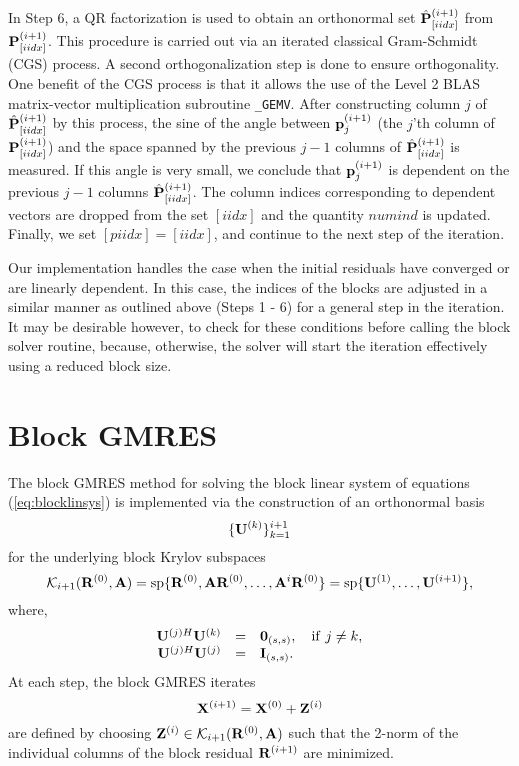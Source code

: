 \documentclass[twoside]{siamltex}
\newcommand{\bA}{{\bf A}}
\newcommand{\bI}{{\bf I}}
\newcommand{\bP}{{\bf P}}
\newcommand{\bZ}{{\bf Z}}
\newcommand{\bU}{{\bf U}}
\newcommand{\bR}{{\bf R}}
\newcommand{\bX}{{\bf X}}
\newcommand{\bp}{{\bf p}}
\newcommand{\dm}{\begin{displaymath}}
\newcommand{\edm}{\end{displaymath}}
\begin{document}
In Step 6, a QR factorization is used to obtain an orthonormal set
${\hat \bP}_{[iidx]}^{(i+1)}$ from $\bP^{(i+1)}_{[iidx]}$. This
procedure is carried out via an iterated classical Gram-Schmidt
(CGS) process. A second orthogonalization step is done to ensure
orthogonality. One benefit of the CGS process is that it allows
the use of the Level 2 {\small BLAS}~\cite{ddhh:88} matrix-vector
multiplication subroutine {\tt \_GEMV}. After constructing column
$j$ of ${\hat \bP}_{[iidx]}^{(i+1)}$ by this process, the sine of
the angle between $\bp_j^{(i+1)}$ (the $j$'th column of
$\bP_{[iidx]}^{(i+1)}$) and the space spanned by the previous
$j-1$ columns of ${\hat \bP}_{[iidx]}^{(i+1)}$ is measured. If
this angle is very small, we conclude that $\bp_j^{(i+1)}$ is
dependent on the previous $j-1$ columns ${\hat
\bP}_{[iidx]}^{(i+1)}$. The column indices corresponding to
dependent vectors are dropped from the set $[iidx]$ and the
quantity $numind$ is updated. Finally, we set $[piidx] = [iidx]$,
and continue to the next step of the iteration.

Our implementation handles the case when the initial residuals
have converged or are linearly dependent. In this case, the
indices of the blocks are adjusted in a similar manner as outlined
above (Steps 1 - 6) for a general step in the iteration. It may be
desirable however, to check for these conditions before calling
the block solver routine, because, otherwise, the solver will
start the iteration effectively using a reduced block size.

\section{Block GMRES}
\label{sec:blkgmres}

The block GMRES method for solving the block linear system of
equations (\ref{eq:blocklinsys}) is implemented via the
construction of an orthonormal basis
 \dm
 \{ \bU^{(k)} \}_{k=1}^{i+1}
 \edm
for the underlying block Krylov subspaces
  \dm
 {\cal K}_{i+1}(\bR^{(0)},\bA) = {\rm sp}\{\bR^{(0)},\bA
 \bR^{(0)},\ldots,\bA^{i}\bR^{(0)}\}= {\rm sp}\{ \bU^{(1)},
 \ldots, \bU^{(i+1)} \},
 \edm
where,
 \dm
 \begin{array}{rcl}
 \bU^{(j)H} \bU^{(k)} &=& {\bf 0}_{(s,s)}, \quad {\rm
 if}~j \ne k, \\
 \bU^{(j)H} \bU^{(j)} &=& \bI_{(s,s)}.
 \end{array}
 \edm
At each step, the block GMRES iterates
 \dm
 \bX^{(i+1)} = \bX^{(0)} + \bZ^{(i)}
 \edm
are defined by choosing $\bZ^{(i)} \in {\cal K}_{i+1}(\bR^{(0)},
\bA)$ such that the 2-norm of the individual columns of the block
residual $\bR^{(i+1)}$ are minimized.
\end{document}
